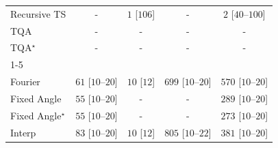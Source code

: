 \begin{tabular}{l|cccc|}
Recursive TS & {\cellcolor[HTML]{000000}} \color[HTML]{F1F1F1} {\cellcolor{white}} \color{black} - & {\cellcolor[HTML]{F7FCF5}} \color[HTML]{000000} $1$ [$106$] & {\cellcolor[HTML]{000000}} \color[HTML]{F1F1F1} {\cellcolor{white}} \color{black} - & {\cellcolor[HTML]{F7FCF5}} \color[HTML]{000000} $2$ [$40$--$100$] \\
TQA & {\cellcolor[HTML]{000000}} \color[HTML]{F1F1F1} {\cellcolor{white}} \color{black} - & {\cellcolor[HTML]{000000}} \color[HTML]{F1F1F1} {\cellcolor{white}} \color{black} - & {\cellcolor[HTML]{000000}} \color[HTML]{F1F1F1} {\cellcolor{white}} \color{black} - & {\cellcolor[HTML]{000000}} \color[HTML]{F1F1F1} {\cellcolor{white}} \color{black} - \\
TQA$^\star$ & {\cellcolor[HTML]{000000}} \color[HTML]{F1F1F1} {\cellcolor{white}} \color{black} - & {\cellcolor[HTML]{000000}} \color[HTML]{F1F1F1} {\cellcolor{white}} \color{black} - & {\cellcolor[HTML]{000000}} \color[HTML]{F1F1F1} {\cellcolor{white}} \color{black} - & {\cellcolor[HTML]{000000}} \color[HTML]{F1F1F1} {\cellcolor{white}} \color{black} - \\
\cline{1-5}
\multicolumn{5}{c}{\rule{0pt}{8pt}SV} \\
\midrule
Fourier & {\cellcolor[HTML]{ECF8E8}} \color[HTML]{000000} $61$ [$10$--$20$] & {\cellcolor[HTML]{F6FCF4}} \color[HTML]{000000} $10$ [$12$] & {\cellcolor[HTML]{016E2D}} \color[HTML]{F1F1F1} $699$ [$10$--$20$] & {\cellcolor[HTML]{2D954D}} \color[HTML]{F1F1F1} $570$ [$10$--$20$] \\
Fixed Angle & {\cellcolor[HTML]{EDF8EA}} \color[HTML]{000000} $55$ [$10$--$20$] & {\cellcolor[HTML]{000000}} \color[HTML]{F1F1F1} {\cellcolor{white}} \color{black} - & {\cellcolor[HTML]{000000}} \color[HTML]{F1F1F1} {\cellcolor{white}} \color{black} - & {\cellcolor[HTML]{A7DBA0}} \color[HTML]{000000} $289$ [$10$--$20$] \\
Fixed Angle$^\star$ & {\cellcolor[HTML]{EDF8EA}} \color[HTML]{000000} $55$ [$10$--$20$] & {\cellcolor[HTML]{000000}} \color[HTML]{F1F1F1} {\cellcolor{white}} \color{black} - & {\cellcolor[HTML]{000000}} \color[HTML]{F1F1F1} {\cellcolor{white}} \color{black} - & {\cellcolor[HTML]{ACDEA6}} \color[HTML]{000000} $273$ [$10$--$20$] \\
Interp & {\cellcolor[HTML]{E8F6E4}} \color[HTML]{000000} $83$ [$10$--$20$] & {\cellcolor[HTML]{F6FCF4}} \color[HTML]{000000} $10$ [$12$] & {\cellcolor[HTML]{00441B}} \color[HTML]{F1F1F1} $805$ [$10$--$22$] & {\cellcolor[HTML]{7FC97F}} \color[HTML]{000000} $381$ [$10$--$20$] \\

\end{tabular}
